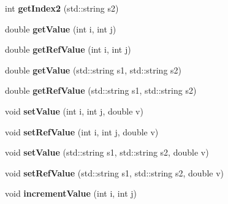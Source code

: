 \begin{DoxyCompactItemize}
\item 
\hypertarget{classDataset_a90c0f70c654055ae973c7167b565ec5d}{int {\bfseries get\-Index2} (std\-::string s2)}\label{classDataset_a90c0f70c654055ae973c7167b565ec5d}

\item 
\hypertarget{classDataset_a7c548cf3734e968d5b6b87ea91f3b57a}{double {\bfseries get\-Value} (int i, int j)}\label{classDataset_a7c548cf3734e968d5b6b87ea91f3b57a}

\item 
\hypertarget{classDataset_a9131823932772c581c556c3eeacc877c}{double {\bfseries get\-Ref\-Value} (int i, int j)}\label{classDataset_a9131823932772c581c556c3eeacc877c}

\item 
\hypertarget{classDataset_a0907b3685958a887937391cd9ae135ab}{double {\bfseries get\-Value} (std\-::string s1, std\-::string s2)}\label{classDataset_a0907b3685958a887937391cd9ae135ab}

\item 
\hypertarget{classDataset_a9235d598760d32cb9cfe32762489b07b}{double {\bfseries get\-Ref\-Value} (std\-::string s1, std\-::string s2)}\label{classDataset_a9235d598760d32cb9cfe32762489b07b}

\item 
\hypertarget{classDataset_a97ba235f117d9fd30fedfd4886e575c5}{void {\bfseries set\-Value} (int i, int j, double v)}\label{classDataset_a97ba235f117d9fd30fedfd4886e575c5}

\item 
\hypertarget{classDataset_ad13a7a7d14f3bf31b5e9c093c728a980}{void {\bfseries set\-Ref\-Value} (int i, int j, double v)}\label{classDataset_ad13a7a7d14f3bf31b5e9c093c728a980}

\item 
\hypertarget{classDataset_a09214d482be48183494020ef5c9466eb}{void {\bfseries set\-Value} (std\-::string s1, std\-::string s2, double v)}\label{classDataset_a09214d482be48183494020ef5c9466eb}

\item 
\hypertarget{classDataset_adf18516b4f2faae53ee90dce084d3bb1}{void {\bfseries set\-Ref\-Value} (std\-::string s1, std\-::string s2, double v)}\label{classDataset_adf18516b4f2faae53ee90dce084d3bb1}

\item 
\hypertarget{classDataset_af77b9e5bfbcc82307f811c06aa743372}{void {\bfseries increment\-Value} (int i, int j)}\label{classDataset_af77b9e5bfbcc82307f811c06aa743372}


\end{DoxyCompactItemize}
